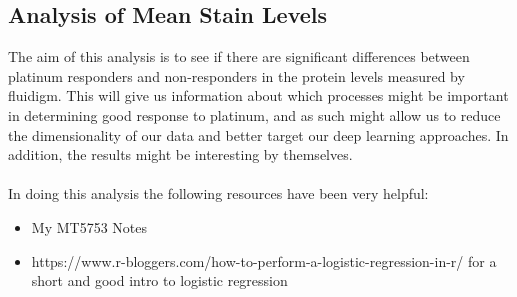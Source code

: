 \documentclass[a4paper]{article}\usepackage[]{graphicx}\usepackage[]{color}
\begin{document}
\begin{center}
\section*{Analysis of Mean Stain Levels}
\end{center}
The aim of this analysis is to see if there are significant differences between platinum responders and non-responders in the protein levels measured by fluidigm. This will give us information about which processes might be important in determining good response to platinum, and as such might allow us to reduce the dimensionality of our data and better target our deep learning approaches. In addition, the results might be interesting by themselves.
\\
\\
In doing this analysis the following resources have been very helpful:
\begin{itemize}
\item My MT5753 Notes
\item https://www.r-bloggers.com/how-to-perform-a-logistic-regression-in-r/ for a short and good intro to logistic regression
\end{itemize}


\end{document}
